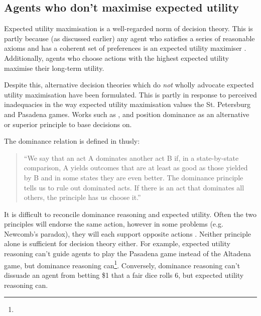 \documentclass{article}
\begin{document}
\subsection{Agents who don't maximise expected utility}

Expected utility maximisation is a well-regarded norm of decision theory. This is partly because (as discussed earlier) any agent who satisfies a series of reasonable axioms and has a coherent set of preferences is an expected utility maximiser \citep{von1944games}. Additionally, agents who choose actions with the highest expected utility maximise their long-term utility. 

Despite this, alternative decision theories which do \textit{not} wholly advocate expected utility maximisation have been formulated. This is partly in response to perceived inadequacies in the way expected utility maximisation values the St. Petersburg and Pasadena games. Works such as \citep{easwaran2009dominance}, \citep{colyvan2008relative} and \citep{colyvan2006no} position dominance as an alternative or superior principle to base decisions on.

The dominance relation is defined in \citep{resnik1987choices} thusly:

\begin{quote}
``We say that an act A dominates another act B if, in a state-by-state comparison, A yields outcomes that are at least as good as those yielded by B and in some states they are even better. The dominance principle tells us to rule out dominated acts. If there is an act that dominates all others, the principle has us choose it.''
\end{quote}

It is difficult to reconcile dominance reasoning and expected utility. Often the two principles will endorse the same action, however in some problems (e.g. Newcomb's paradox), they will each support opposite actions \citep[pg. 101]{resnik1987choices}. Neither principle alone is sufficient for decision theory either. For example, expected utility reasoning can't guide agents to play the Pasadena game instead of the Altadena game, but dominance reasoning can\footnote{}. Conversely, dominance reasoning can't dissuade an agent from betting \$1 that a fair dice rolls 6, but expected utility reasoning can. 
\end{document}
